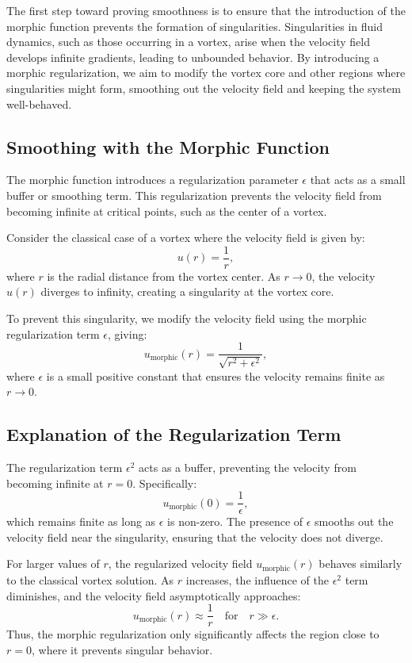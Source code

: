 \documentclass{article}
\begin{document}
The first step toward proving smoothness is to ensure that the introduction of the morphic function prevents the formation of singularities. Singularities in fluid dynamics, such as those occurring in a vortex, arise when the velocity field develops infinite gradients, leading to unbounded behavior. By introducing a morphic regularization, we aim to modify the vortex core and other regions where singularities might form, smoothing out the velocity field and keeping the system well-behaved.

\subsection*{Smoothing with the Morphic Function}

The morphic function introduces a regularization parameter \( \epsilon \) that acts as a small buffer or smoothing term. This regularization prevents the velocity field from becoming infinite at critical points, such as the center of a vortex.

Consider the classical case of a vortex where the velocity field is given by:
\[
u(r) = \frac{1}{r},
\]
where \( r \) is the radial distance from the vortex center. As \( r \to 0 \), the velocity \( u(r) \) diverges to infinity, creating a singularity at the vortex core.

To prevent this singularity, we modify the velocity field using the morphic regularization term \( \epsilon \), giving:
\[
u_{\text{morphic}}(r) = \frac{1}{\sqrt{r^2 + \epsilon^2}},
\]
where \( \epsilon \) is a small positive constant that ensures the velocity remains finite as \( r \to 0 \).

\subsection*{Explanation of the Regularization Term}

The regularization term \( \epsilon^2 \) acts as a buffer, preventing the velocity from becoming infinite at \( r = 0 \). Specifically:
\[
u_{\text{morphic}}(0) = \frac{1}{\epsilon},
\]
which remains finite as long as \( \epsilon \) is non-zero. The presence of \( \epsilon \) smooths out the velocity field near the singularity, ensuring that the velocity does not diverge.

For larger values of \( r \), the regularized velocity field \( u_{\text{morphic}}(r) \) behaves similarly to the classical vortex solution. As \( r \) increases, the influence of the \( \epsilon^2 \) term diminishes, and the velocity field asymptotically approaches:
\[
u_{\text{morphic}}(r) \approx \frac{1}{r} \quad \text{for} \quad r \gg \epsilon.
\]
Thus, the morphic regularization only significantly affects the region close to \( r = 0 \), where it prevents singular behavior.
\end{document}
